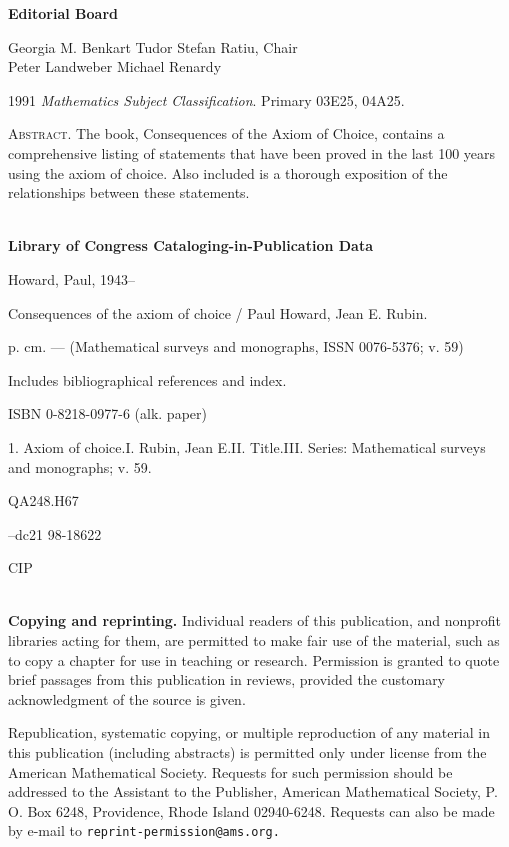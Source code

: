 \begin{copyrightpage}
\begin{center}
\textbf{Editorial Board}

\qquad \qquad Georgia M. Benkart \quad Tudor Stefan Ratiu, Chair \\
Peter Landweber \qquad Michael Renardy

1991 \emph{Mathematics Subject Classification}. Primary 03E25,
04A25.
\end{center}

\noindent \textsc{Abstract}. The book, Consequences of the Axiom of
Choice, contains a comprehensive listing of statements that have
been proved in the last 100 years using the axiom of choice. Also
included is a thorough exposition of the relationships between these
statements.

\hrulefill\\

\noindent \textbf{Library of Congress Cataloging-in-Publication
Data}

\noindent Howard, Paul, 1943--

Consequences of the axiom of choice / Paul Howard, Jean E. Rubin.

\quad p. cm. --- (Mathematical surveys and monographs, ISSN
0076-5376; v. 59)

Includes bibliographical references and index.

ISBN 0-8218-0977-6 (alk. paper)

1. Axiom of choice.\quad I. Rubin, Jean E.\quad II. Title.\quad III.
Series: Mathematical surveys and monographs; v. 59.

\noindent QA248.H67 

--dc21 \hfill 98-18622

\hfill CIP

\hrulefill\\

\noindent\textbf{Copying and reprinting.} Individual readers of this
publication, and nonprofit libraries acting for them, are permitted
to make fair use of the material, such as to copy a chapter for use
in teaching or research. Permission is granted to quote brief
passages from this publication in reviews, provided the customary
acknowledgment of the source is given.

Republication, systematic copying, or multiple reproduction of any
material in this publication (including abstracts) is permitted only
under license from the American Mathematical Society. Requests for
such permission should be addressed to the Assistant to the
Publisher, American Mathematical Society, P. O. Box 6248,
Providence, Rhode Island 02940-6248. Requests can also be made by
e-mail to \texttt{reprint-permission@ams.org.}


\end{copyrightpage}
